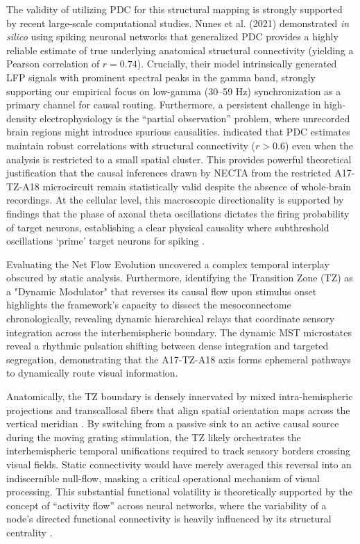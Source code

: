 The validity of utilizing PDC for this structural mapping is strongly supported by recent large-scale computational studies. Nunes et al. (2021) demonstrated \textit{in silico} using spiking neuronal networks that generalized PDC provides a highly reliable estimate of true underlying anatomical structural connectivity (yielding a Pearson correlation of $r=0.74$). Crucially, their model intrinsically generated LFP signals with prominent spectral peaks in the gamma band, strongly supporting our empirical focus on low-gamma (30--59 Hz) synchronization as a primary channel for causal routing. Furthermore, a persistent challenge in high-density electrophysiology is the ``partial observation'' problem, where unrecorded brain regions might introduce spurious causalities. \cite{Nunes_2021} indicated that PDC estimates maintain robust correlations with structural connectivity ($r > 0.6$) even when the analysis is restricted to a small spatial cluster. This provides powerful theoretical justification that the causal inferences drawn by NECTA from the restricted A17-TZ-A18 microcircuit remain statistically valid despite the absence of whole-brain recordings. At the cellular level, this macroscopic directionality is supported by findings that the phase of axonal theta oscillations dictates the firing probability of target neurons, establishing a clear physical causality where subthreshold oscillations `prime' target neurons for spiking \cite{Lassers2026}. 

Evaluating the Net Flow Evolution uncovered a complex temporal interplay obscured by static analysis. Furthermore, identifying the Transition Zone (TZ) as a "Dynamic Modulator" that reverses its causal flow upon stimulus onset highlights the framework's capacity to dissect the mesoconnectome chronologically, revealing dynamic hierarchical relays that coordinate sensory integration across the interhemispheric boundary. The dynamic MST microstates reveal a rhythmic pulsation shifting between dense integration and targeted segregation, demonstrating that the A17-TZ-A18 axis forms ephemeral pathways to dynamically route visual information.

Anatomically, the TZ boundary is densely innervated by mixed intra-hemispheric projections and transcallosal fibers that align spatial orientation maps across the vertical meridian \cite{schmidt2023}. By switching from a passive sink to an active causal source during the moving grating stimulation, the TZ likely orchestrates the interhemispheric temporal unifications required to track sensory borders crossing visual fields. Static connectivity would have merely averaged this reversal into an indiscernible null-flow, masking a critical operational mechanism of visual processing. This substantial functional volatility is theoretically supported by the concept of ``activity flow'' across neural networks, where the variability of a node's directed functional connectivity is heavily influenced by its structural centrality \cite{Nunes_2021}. 

